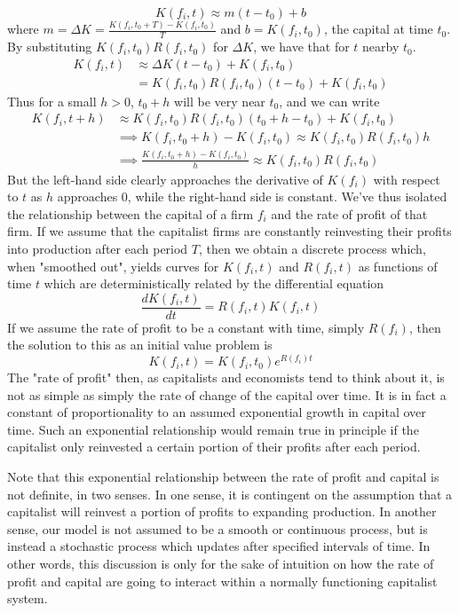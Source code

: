 \[ K(f_i,t) \approx m(t-t_0)+b \]
where $m = \Delta K = \frac{K(f_i,t_0+T)-K(f_i,t_0)}{T}$ and $b = K(f_i,t_0)$, the capital at time $t_0$. By substituting $K(f_i,t_0)R(f_i,t_0)$ for $\Delta K$, we have that for $t$ nearby $t_0$.
\begin{align}
 	K(f_i,t) &\approx \Delta K(t-t_0)+K(f_i,t_0) \\
 			&= K(f_i,t_0)R(f_i,t_0)(t-t_0) + K(f_i,t_0)  
\end{align}
Thus for a small $h>0$, $t_0+h$ will be very near $t_0$, and we can write
\begin{align}
	K(f_i,t+h) &\approx K(f_i,t_0)R(f_i,t_0)(t_0+h-t_0) + K(f_i,t_0) \\
	&\implies K(f_i,t_0+h)-K(f_i,t_0) \approx K(f_i,t_0)R(f_i,t_0)h \\
	&\implies \frac{K(f_i,t_0+h)-K(f_i,t_0)}{h} \approx K(f_i,t_0)R(f_i,t_0)
\end{align}
But the left-hand side clearly approaches the derivative of $K(f_i)$ with respect to $t$ as $h$ approaches $0$, while the right-hand side is constant. We've thus isolated the relationship between the capital of a firm $f_i$ and the rate of profit of that firm. If we assume that the capitalist firms are constantly reinvesting their profits into production after each period $T$, then we obtain a discrete process which, when "smoothed out", yields curves for $K(f_i,t)$ and $R(f_i,t)$ as functions of time $t$ which are deterministically related by the differential equation
\[ \frac{dK(f_i,t)}{dt} = R(f_i,t)K(f_i,t) \]
If we assume the rate of profit to be a constant with time, simply $R(f_i)$, then the solution to this as an initial value problem is 
\[ K(f_i,t) = K(f_i,t_0)e^{R(f_i)t} \] 
The "rate of profit" then, as capitalists and economists tend to think about it, is not as simple as simply the rate of change of the capital over time. It is in fact a constant of proportionality to an assumed exponential growth in capital over time. Such an exponential relationship would remain true in principle if the capitalist only reinvested a certain portion of their profits after each period. \par 
Note that this exponential relationship between the rate of profit and capital is not definite, in two senses. In one sense, it is contingent on the assumption that a capitalist will reinvest a portion of profits to expanding production. In another sense, our model is not assumed to be a smooth or continuous process, but is instead a stochastic process which updates after specified intervals of time. In other words, this discussion is only for the sake of intuition on how the rate of profit and capital are going to interact within a normally functioning capitalist system. \par 
